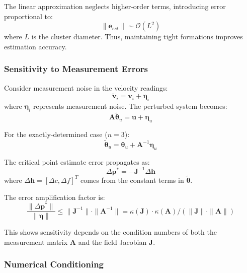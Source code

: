 \documentclass[lettersize,journal]{IEEEtran}
\begin{document}
The linear approximation neglects higher-order terms, introducing error proportional to:
\begin{equation}
\|\mathbf{e}_{est}\| \sim \mathcal{O}(L^2)
\end{equation}
where $L$ is the cluster diameter. Thus, maintaining tight formations improves estimation accuracy.

\subsubsection{Sensitivity to Measurement Errors}

Consider measurement noise in the velocity readings:
\begin{equation}
\tilde{\mathbf{v}}_i = \mathbf{v}_i + \boldsymbol{\eta}_i
\end{equation}
where $\boldsymbol{\eta}_i$ represents measurement noise. The perturbed system becomes:
\begin{equation}
\mathbf{A}\tilde{\boldsymbol{\theta}}_u = \mathbf{u} + \boldsymbol{\eta}_u
\end{equation}

For the exactly-determined case ($n = 3$):
\begin{equation}
\tilde{\boldsymbol{\theta}}_u = \boldsymbol{\theta}_u + \mathbf{A}^{-1}\boldsymbol{\eta}_u
\end{equation}

The critical point estimate error propagates as:
\begin{equation}
\Delta\mathbf{p}^* = -\mathbf{J}^{-1}\Delta\mathbf{h}
\end{equation}
where $\Delta\mathbf{h} = [\Delta c, \Delta f]^T$ comes from the constant terms in $\tilde{\boldsymbol{\theta}}$.

The error amplification factor is:
\begin{equation}
\frac{\|\Delta\mathbf{p}^*\|}{\|\boldsymbol{\eta}\|} \leq \|\mathbf{J}^{-1}\| \cdot \|\mathbf{A}^{-1}\| = \kappa(\mathbf{J}) \cdot \kappa(\mathbf{A}) / (\|\mathbf{J}\| \cdot \|\mathbf{A}\|)
\end{equation}

This shows sensitivity depends on the condition numbers of both the measurement matrix $\mathbf{A}$ and the field Jacobian $\mathbf{J}$.

\subsubsection{Numerical Conditioning}
\end{document}
